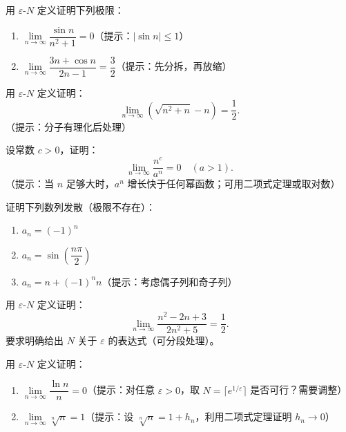 \documentclass[fontset=fandol]{ctexart}
\begin{document}
\begin{exercise}
用 \(\varepsilon\)-\(N\) 定义证明下列极限：
\begin{enumerate}
\item \(\lim\limits_{n\to\infty} \dfrac{\sin n}{n^2 + 1} = 0\)（提示：\(|\sin n| \leq 1\)）
\item \(\lim\limits_{n\to\infty} \dfrac{3n + \cos n}{2n - 1} = \dfrac{3}{2}\)（提示：先分拆，再放缩）
\end{enumerate}
\end{exercise}

\begin{exercise}
用 \(\varepsilon\)-\(N\) 定义证明：
\[
\lim_{n\to\infty} \left(\sqrt{n^2 + n} - n\right) = \dfrac{1}{2}.
\]
（提示：分子有理化后处理）
\end{exercise}

\begin{exercise}
设常数 \(c > 0\)，证明：
\[
\lim_{n\to\infty} \dfrac{n^c}{a^n} = 0 \quad (a > 1).
\]
（提示：当 \(n\) 足够大时，\(a^n\) 增长快于任何幂函数；可用二项式定理或取对数）
\end{exercise}

\begin{exercise}
证明下列数列发散（极限不存在）：
\begin{enumerate}
\item \(a_n = (-1)^n\)
\item \(a_n = \sin\left(\dfrac{n\pi}{2}\right)\)
\item \(a_n = n + (-1)^n n\)（提示：考虑偶子列和奇子列）
\end{enumerate}
\end{exercise}

\begin{exercise}
用 \(\varepsilon\)-\(N\) 定义证明：
\[
\lim_{n\to\infty} \dfrac{n^2 - 2n + 3}{2n^2 + 5} = \dfrac{1}{2}.
\]
要求明确给出 \(N\) 关于 \(\varepsilon\) 的表达式（可分段处理）。
\end{exercise}

\begin{exercise}
用 \(\varepsilon\)-\(N\) 定义证明：
\begin{enumerate}
\item \(\lim\limits_{n\to\infty} \dfrac{\ln n}{n} = 0\)（提示：对任意 \(\varepsilon > 0\)，取 \(N = \lceil e^{1/\varepsilon} \rceil\) 是否可行？需要调整）
\item \(\lim\limits_{n\to\infty} \sqrt[n]{n} = 1\)（提示：设 \(\sqrt[n]{n} = 1 + h_n\)，利用二项式定理证明 \(h_n \to 0\)）
\end{enumerate}
\end{exercise}
\end{document}
